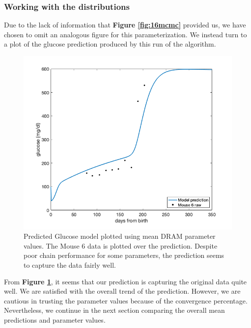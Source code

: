 \documentclass{article}
\begin{document}
\subsubsection{Working with the distributions}
Due to the lack of information that \textbf{Figure \ref{fig:16mcmc}} provided us, we have chosen to omit an analogous figure for this parameterization. We instead turn to a plot of the glucose prediction produced by this run of the algorithm.
\begin{figure}[H]
    \centering
    \includegraphics[width=15cm]{MCMC_figs/dram_t1d_final/jul10_mouse6_run1(noIC)_acute_NOD_waveOn_lietal_meanpred.png}
    \caption{Predicted Glucose model plotted using mean DRAM parameter values. The Mouse 6 data is plotted over the prediction. Despite poor chain performance for some parameters, the prediction seems to capture the data fairly well.}
    \label{fig:20mcmc}
\end{figure}
From \textbf{Figure \ref{fig:20mcmc}}, it seems that our prediction is capturing the original data quite well. We are satisfied with the overall trend of the prediction. However, we are cautious in trusting the parameter values because of the convergence percentage. Nevertheless, we continue in the next section comparing the overall mean predictions and parameter values.
\end{document}
